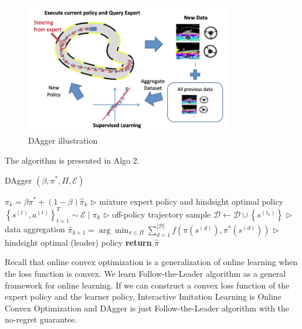 \documentclass[11pt]{article}
\begin{document}
\begin{figure}[H]
\centering
\includegraphics[width=0.8\textwidth]{dagger.png}
\caption{DAgger illustration}
\label{fig:dagger}
\end{figure}

The algorithm is presented in Algo 2.
\begin{algorithm}[H]
\caption{DAgger $\left(\beta, \pi^{*}, \Pi, \mathcal{E}\right)$}
\begin{algorithmic}[1]
\STATE $\pi_{k}=\beta \pi^{*}+(1-\beta) \hat{\pi}_{k}$ \hfill $\triangleright$ mixture expert policy and hindsight optimal policy
\STATE  $\left\{s^{(t)}, a^{(t)}\right\}_{t=1}^{T} \sim \mathcal{E} \mid \pi_{k} $ \hfill$\triangleright$ off-policy trajectory sample
\STATE  $\mathcal{D} \leftarrow \mathcal{D} \cup\left\{s^{\left(t_{k}\right)}\right\}$ \hfill $\triangleright$ data aggregation
\STATE  $\hat{\pi}_{k+1}=\arg \min _{\pi \in \Pi} \sum_{d=1}^{|\mathcal{D}|} f\left(\pi\left(s^{(d)}\right), \pi^{*}\left(s^{(d)}\right)\right)$ \hfill $\triangleright$ hindsight optimal (leader) policy
\ENDFOR
\STATE \textbf{return} $\hat{\pi}$
\label{algo:dagger}
\end{algorithmic}
\end{algorithm}

Recall that online convex optimization is a generalization of online learning when the loss function is convex. We learn Follow-the-Leader algorithm as a general framework for online learning. If we can construct a convex loss function of the expert policy and the learner  policy, Interactive Imitation Learning is
Online Convex Optimization and DAgger is just Follow-the-Leader algorithm with the no-regret guarantee.
\end{document}
